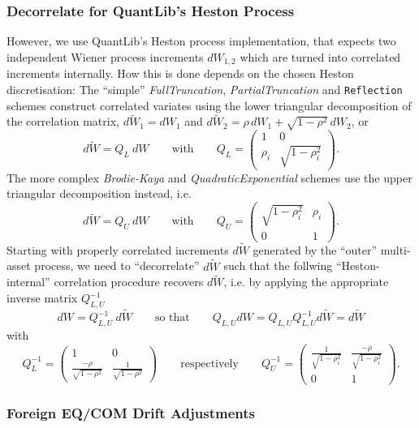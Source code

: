 \subsubsection*{Decorrelate for QuantLib's Heston Process}

However, we use QuantLib's Heston process implementation, that expects two independent Wiener process increments
$dW_{1,2}$ which are turned into correlated increments internally. How this is done depends on the chosen
Heston discretisation: The ``simple'' {\em FullTruncation}, {\em PartialTruncation} and
{\tt Reflection} schemes construct correlated variates using the lower triangular decomposition of the
correlation matrix, $d\widetilde W_1=dW_1$ and $d\widetilde W_2=\rho\, dW_1 + \sqrt{1-\rho^2}\,dW_2$, or
$$
d\widetilde W = Q_L\:dW\qquad\mbox{with}\qquad
Q_L = \left(\begin{array}{cc} 1 & 0 \\ \rho_i & \sqrt{1-\rho_i^2} \end{array} \right).
$$
The more complex {\em Brodie-Kaya} and {\em QuadraticExponential} schemes use the upper triangular
decomposition instead, i.e. 
$$
d\widetilde W = Q_U\:dW \qquad\mbox{with}\qquad
Q_U = \left(\begin{array}{cc} \sqrt{1-\rho_i^2} & \rho_i \\ 0 & 1 \end{array} \right).
$$
Starting with properly correlated increments $d\widetilde W$ generated by the ``outer'' multi-asset
process, we need to ``decorrelate'' $d\widetilde W$ such that the follwing ``Heston-internal''
correlation procedure recovers $d\widetilde W$, i.e. by applying the appropriate inverse
matrix $Q_{L,U}^{-1}$
$$
dW = Q_{L,U}^{-1}\: d\widetilde W \qquad\mbox{so that}\qquad Q_{L,U} dW = Q_{L,U}Q^{-1}_{L,U} d\widetilde W = d\widetilde W
$$
with
$$
Q_L^{-1} = \left(\begin{array}{cc} 1 & 0 \\ \frac{-\rho}{\sqrt{1-\rho^2}} & \frac{1}{\sqrt{1-\rho^2}}\end{array} \right)  \qquad\mbox{respectively}\qquad
Q_U^{-1} = \left(\begin{array}{cc} \frac{1}{\sqrt{1-\rho_i^2}} & \frac{-\rho}{\sqrt{1-\rho_i^2}} \\ 0 & 1 \end{array} \right).
$$

\subsubsection*{Foreign EQ/COM Drift Adjustments}

